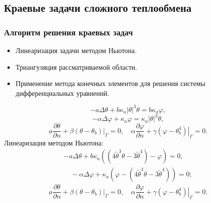 \subsection{Краевые задачи сложного теплообмена}\label{subsec:solve-direct}
\begin{frame}
    \frametitle{Алгоритм решения краевых задач}
    \begin{itemize}
        \item Линеаризация задачи методом Ньютона.
        \item Триангуляция рассматриваемой области.
        \item Применение метода конечных элементов для решения системы дифференциальных уравнений.
    \end{itemize}
    \begin{equation}
        \label{eq:4_1:1}
        -a \Delta \theta+b \kappa_{a}| \theta|^{3} \theta =
        b \kappa_{a} \varphi,
    \end{equation}
    \begin{equation}
        \label{eq:4_1:2}
        -\alpha \Delta \varphi+\kappa_{a} \varphi =
        \kappa_{a}|\theta|^{3} \theta,
    \end{equation}
    \begin{equation}
        \label{eq:4_1:3}
        a \frac{\partial \theta}{\partial n}
        +\left.\beta\left(\theta-\theta_{b}\right)\right|_{\Gamma}=0,
        \quad \alpha \frac{\partial \varphi}{\partial n}
        +\left.\gamma\left(\varphi-\theta_{b}^{4}\right)\right|_{\Gamma}=0.
    \end{equation}
    Линеаризация методом Ньютона:
    \begin{equation}
        \tag{L1}
        \label{eq:L1}
        \begin{gathered}
            -a \Delta \theta+b \kappa_{a}\left(\left(4 \widetilde{\theta}^{3}
            \theta-3 \widetilde{\theta}^{4}\right)-\varphi\right)=0,\\
            \quad-\alpha \Delta \varphi
            +\kappa_{a}\left(\varphi
            -\left(4 \widetilde{\theta}^{3}
            \theta-3 \widetilde{\theta}^{4}\right)\right)=0;
        \end{gathered}
    \end{equation}
    \begin{equation}
        \tag{L2}
        \label{eq:L2}
        a \frac{\partial \theta}{\partial n}
        +\left.\beta\left(\theta-\theta_{b}\right)\right|_{\Gamma}=0,
        \quad \alpha \frac{\partial \varphi}{\partial n}
        +\left.\gamma\left(\varphi-\theta_{b}^{4}\right)\right|_{\Gamma}=0.
    \end{equation}
\end{frame}


